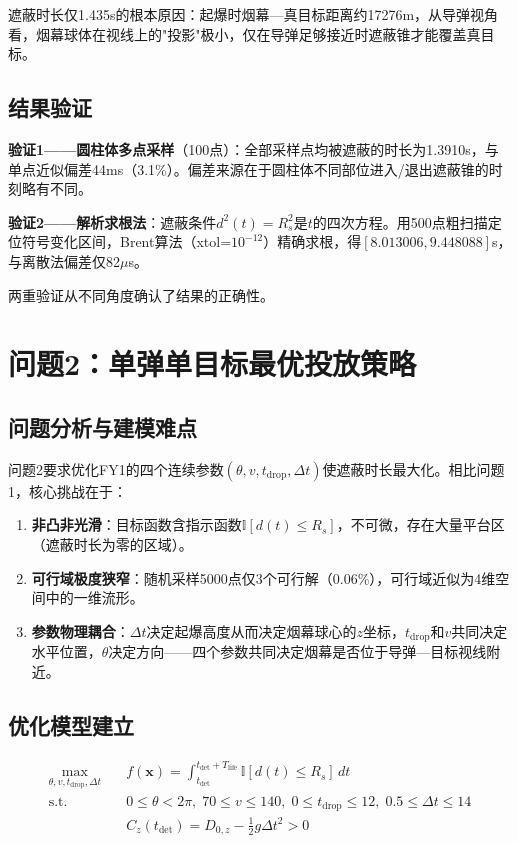\documentclass[12pt,a4paper]{ctexart}
\begin{document}
遮蔽时长仅1.435s的根本原因：起爆时烟幕—真目标距离约17276m，从导弹视角看，烟幕球体在视线上的"投影"极小，仅在导弹足够接近时遮蔽锥才能覆盖真目标。

\subsection{结果验证}

\textbf{验证1——圆柱体多点采样}（100点）：全部采样点均被遮蔽的时长为1.3910s，与单点近似偏差44ms（3.1\%）。偏差来源在于圆柱体不同部位进入/退出遮蔽锥的时刻略有不同。

\textbf{验证2——解析求根法}：遮蔽条件$d^2(t)=R_s^2$是$t$的四次方程。用500点粗扫描定位符号变化区间，Brent算法（xtol=$10^{-12}$）精确求根，得$[8.013006, 9.448088]$s，与离散法偏差仅82$\mu$s。

两重验证从不同角度确认了结果的正确性。

\section{问题2：单弹单目标最优投放策略}

\subsection{问题分析与建模难点}

问题2要求优化FY1的四个连续参数$(\theta,v,t_{\text{drop}},\Delta t)$使遮蔽时长最大化。相比问题1，核心挑战在于：

\begin{enumerate}[label=(\arabic*)]
    \item \textbf{非凸非光滑}：目标函数含指示函数$\mathbb{I}[d(t)\leq R_s]$，不可微，存在大量平台区（遮蔽时长为零的区域）。
    \item \textbf{可行域极度狭窄}：随机采样5000点仅3个可行解（0.06\%），可行域近似为4维空间中的一维流形。
    \item \textbf{参数物理耦合}：$\Delta t$决定起爆高度从而决定烟幕球心的$z$坐标，$t_{\text{drop}}$和$v$共同决定水平位置，$\theta$决定方向——四个参数共同决定烟幕是否位于导弹—目标视线附近。
\end{enumerate}

\subsection{优化模型建立}

\begin{equation}
\begin{aligned}
    \max_{\theta, v, t_{\text{drop}}, \Delta t} \quad & f(\mathbf{x}) = \int_{t_{\text{det}}}^{t_{\text{det}}+T_{\text{life}}} \mathbb{I}[d(t) \leq R_s] \, dt \\
    \text{s.t.} \quad & 0 \leq \theta < 2\pi,\; 70 \leq v \leq 140,\; 0 \leq t_{\text{drop}} \leq 12,\; 0.5 \leq \Delta t \leq 14 \\
    & C_z(t_{\text{det}}) = D_{0,z} - \tfrac{1}{2}g\Delta t^2 > 0
\end{aligned}
\end{equation}
\end{document}
